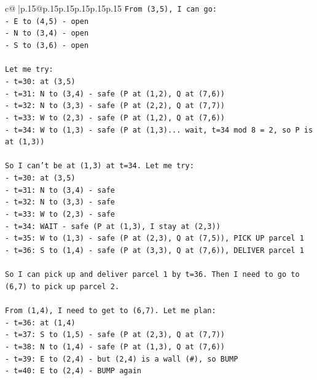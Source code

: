 \documentclass{article}
\begin{document}
{\begin{supertabular}{c@{$\;$}|p{.15\linewidth}@{}p{.15\linewidth}p{.15\linewidth}p{.15\linewidth}p{.15\linewidth}p{.15\linewidth}}
{{{\texttt{From (3,5), I can go:} \\
\texttt{{-} E to (4,5) {-} open} \\
\texttt{{-} N to (3,4) {-} open} \\
\texttt{{-} S to (3,6) {-} open} \\
\\ 
\texttt{Let me try:} \\
\texttt{{-} t=30: at (3,5)} \\
\texttt{{-} t=31: N to (3,4) {-} safe (P at (1,2), Q at (7,6))} \\
\texttt{{-} t=32: N to (3,3) {-} safe (P at (2,2), Q at (7,7))} \\
\texttt{{-} t=33: W to (2,3) {-} safe (P at (1,2), Q at (7,6))} \\
\texttt{{-} t=34: W to (1,3) {-} safe (P at (1,3)... wait, t=34 mod 8 = 2, so P is at (1,3))} \\
\\ 
\texttt{So I can't be at (1,3) at t=34. Let me try:} \\
\texttt{{-} t=30: at (3,5)} \\
\texttt{{-} t=31: N to (3,4) {-} safe} \\
\texttt{{-} t=32: N to (3,3) {-} safe} \\
\texttt{{-} t=33: W to (2,3) {-} safe} \\
\texttt{{-} t=34: WAIT {-} safe (P at (1,3), I stay at (2,3))} \\
\texttt{{-} t=35: W to (1,3) {-} safe (P at (2,3), Q at (7,5)), PICK UP parcel 1} \\
\texttt{{-} t=36: S to (1,4) {-} safe (P at (3,3), Q at (7,6)), DELIVER parcel 1} \\
\\ 
\texttt{So I can pick up and deliver parcel 1 by t=36. Then I need to go to (6,7) to pick up parcel 2.} \\
\\ 
\texttt{From (1,4), I need to get to (6,7). Let me plan:} \\
\texttt{{-} t=36: at (1,4)} \\
\texttt{{-} t=37: S to (1,5) {-} safe (P at (2,3), Q at (7,7))} \\
\texttt{{-} t=38: N to (1,4) {-} safe (P at (1,3), Q at (7,6))} \\
\texttt{{-} t=39: E to (2,4) {-} but (2,4) is a wall (\#), so BUMP} \\
\texttt{{-} t=40: E to (2,4) {-} BUMP again} \\
\\ 
}}}
\end{supertabular}}
\end{document}
